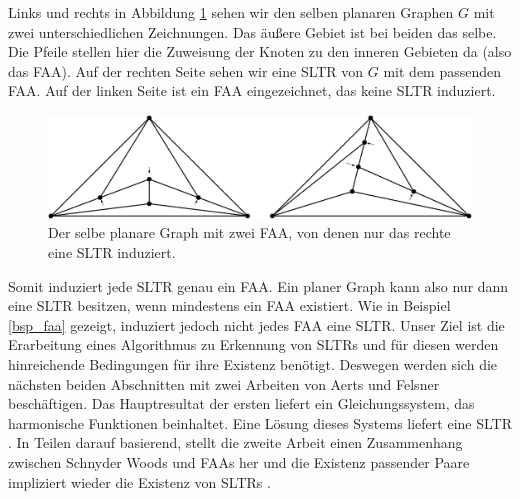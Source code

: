 \begin{example}\label{bsp_faa}
Links und rechts in Abbildung \ref{exp_faa} sehen wir den selben planaren Graphen $G$ mit zwei unterschiedlichen Zeichnungen. Das äußere Gebiet ist bei beiden das selbe. Die Pfeile stellen hier die Zuweisung der Knoten zu den inneren Gebieten da (also das FAA). Auf der rechten Seite sehen wir eine SLTR von $G$ mit dem passenden FAA. Auf der linken Seite ist ein FAA eingezeichnet, das keine SLTR induziert.

\begin{figure}[h]
	\centering
  \includegraphics[width=1\textwidth]{faa_def.png}
  \caption{Der selbe planare Graph mit zwei FAA, von denen nur das rechte eine SLTR induziert.}
  \label{exp_faa}
\end{figure}
\end{example}

Somit induziert jede SLTR genau ein FAA. Ein planer Graph kann also nur dann eine SLTR besitzen, wenn mindestens ein FAA existiert. Wie in Beispiel \ref{bsp_faa} gezeigt, induziert jedoch nicht jedes FAA eine SLTR. Unser Ziel ist die Erarbeitung eines Algorithmus zu Erkennung von SLTRs und für diesen werden hinreichende Bedingungen für ihre Existenz benötigt. Deswegen werden sich die nächsten beiden Abschnitten mit zwei Arbeiten von Aerts und Felsner beschäftigen. Das Hauptresultat der ersten liefert ein Gleichungssystem, das harmonische Funktionen beinhaltet. Eine Lösung dieses Systems liefert eine SLTR \cite{af13}. In Teilen darauf basierend, stellt die zweite Arbeit einen Zusammenhang zwischen Schnyder Woods und FAAs her und die Existenz passender Paare impliziert wieder die Existenz von SLTRs \cite{af15}.



